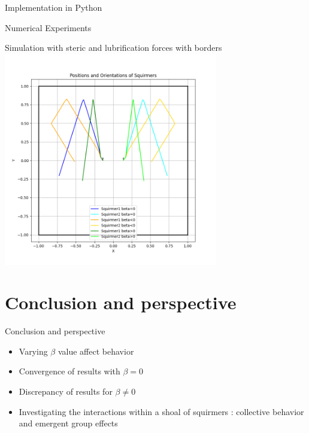 \documentclass{beamer}
\begin{document}
\begin{frame}{Implementation in Python}
\begin{frame}{Numerical Experiments}
    \begin{center}
        Simulation with steric and lubrification forces with borders
        \includegraphics[width=0.7\textwidth]{../../graphs/simulations/bordersquirmer/border_sq2.pi.2.png}
    \end{center}
\end{frame}

\section{Conclusion and perspective}
\begin{frame}{Conclusion and perspective}
    \begin{center}
        \begin{itemize}
            \item Varying $\beta$ value affect behavior
            \item Convergence of results with $\beta = 0$
            \item Discrepancy of results for $\beta \ne 0$
            \item Investigating the interactions within a shoal of squirmers : collective behavior and emergent group effects
        \end{itemize}
    \end{center}
\end{frame}


\end{frame}
\end{document}
